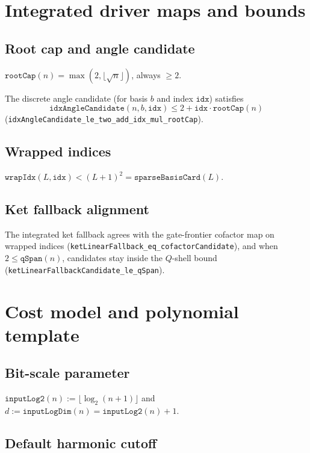 \documentclass[11pt,a4paper]{article}
\theoremstyle{plain}
\theoremstyle{definition}
\theoremstyle{remark}
\begin{document}
\section{Integrated driver maps and bounds}

\subsection{Root cap and angle candidate}

$\texttt{rootCap}(n) = \max(2,\lfloor\sqrt{n}\rfloor)$, always $\ge 2$.

The discrete angle candidate (for basis $b$ and index $\texttt{idx}$) satisfies
\[
\texttt{idxAngleCandidate}(n,b,\texttt{idx}) \le 2 + \texttt{idx}\cdot \texttt{rootCap}(n)
\]
(\texttt{idxAngleCandidate\_le\_two\_add\_idx\_mul\_rootCap}).

\subsection{Wrapped indices}

$\texttt{wrapIdx}(L,\texttt{idx}) < (L+1)^2 = \texttt{sparseBasisCard}(L)$.

\subsection{Ket fallback alignment}

The integrated ket fallback agrees with the gate-frontier cofactor map on wrapped
indices (\texttt{ketLinearFallback\_eq\_cofactorCandidate}), and when
$2 \le \texttt{qSpan}(n)$, candidates stay inside the $Q$-shell bound
(\texttt{ketLinearFallbackCandidate\_le\_qSpan}).

\section{Cost model and polynomial template}

\subsection{Bit-scale parameter}

$\texttt{inputLog2}(n) := \lfloor \log_2(n+1)\rfloor$ and
$d := \texttt{inputLogDim}(n) = \texttt{inputLog2}(n)+1$.

\subsection{Default harmonic cutoff}
\end{document}
